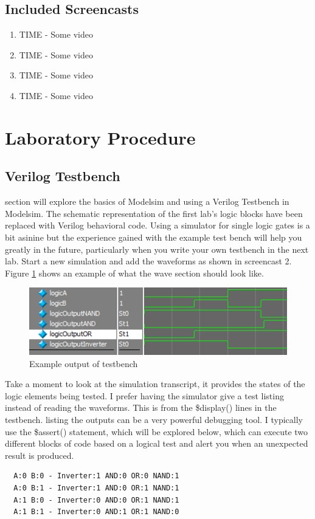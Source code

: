     \subsection{Included Screencasts}
      \begin{enumerate}
        \item TIME - Some video
        \item TIME - Some video
        \item TIME - Some video
        \item TIME - Some video
      \end{enumerate}

  \section{Laboratory Procedure}
  \subsection{Verilog Testbench}
     section will explore the basics of Modelsim and using a Verilog Testbench in Modelsim. The schematic representation of the first lab's logic blocks have been replaced with Verilog behavioral code. Using a simulator for single logic gates is a bit asinine but the experience gained with the example test bench will help you greatly in the future, particularly when you write your own testbench in the next lab. Start a new simulation and add the waveforms as shown in screencast 2. Figure \ref{LogicOut} shows an example of what the wave section should look like. 
    \begin{figure}[H]
      \label{LogicOut}
      \includegraphics[width=.48\textwidth]{Images/LogicOutput.png}
      \caption{Example output of testbench}
    \end{figure}

    Take a moment to look at the simulation transcript, it provides the states of the logic elements being tested.
    I prefer having the simulator give a test listing instead of reading the waveforms. This is from the \$display()
    lines in the testbench. listing the outputs can be a very powerful debugging tool. I typically use the \$assert()
    statement, which will be explored below, which can execute two different blocks of code based on a logical test and alert you when an unexpected result is produced.
    \begin{lstlisting}
  A:0 B:0 - Inverter:1 AND:0 OR:0 NAND:1
  A:0 B:1 - Inverter:1 AND:0 OR:1 NAND:1
  A:1 B:0 - Inverter:0 AND:0 OR:1 NAND:1
  A:1 B:1 - Inverter:0 AND:1 OR:1 NAND:0
    \end{lstlisting}

